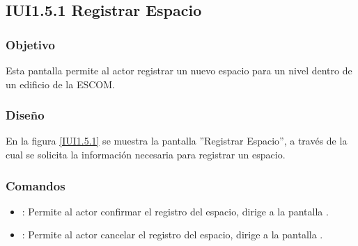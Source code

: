 \subsection{IUI1.5.1 Registrar Espacio}

\subsubsection{Objetivo}
	Esta pantalla permite al actor registrar un nuevo espacio para un nivel dentro de un edificio de la ESCOM.

\subsubsection{Diseño}

    En la figura \ref{IUI1.5.1} se muestra la pantalla ''Registrar Espacio'', a través de la cual se solicita la información necesaria para registrar un espacio.
 

\subsubsection{Comandos}
    \begin{itemize}
	\item {}: Permite al actor confirmar el registro del espacio, dirige a la pantalla .
	
	\item {}: Permite al actor cancelar el registro del espacio, dirige a la pantalla .
    \end{itemize}
